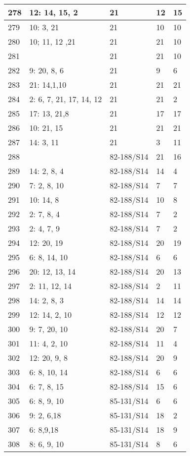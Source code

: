 \documentclass{article} %
\begin{document}
\begin{longtable}{| l | l | l | l | l |}
        278 & 12: 14, 15, 2 & 21 & 12 & 15 \\ \hline
        279 & 10: 3, 21 & 21 & 10 & 10 \\ \hline
        280 & 10; 11, 12 ,21 & 21 & 21 & 10 \\ \hline
        281 &  & 21 & 21 & 10 \\ \hline
        282 & 9: 20, 8, 6 & 21 & 9 & 6 \\ \hline
        283 & 21: 14,1,10 & 21 & 21 & 21 \\ \hline
        284 & 2: 6, 7, 21, 17, 14, 12 & 21 & 21 & 2 \\ \hline
        285 & 17: 13, 21,8 & 21 & 17 & 17 \\ \hline
        286 & 10: 21, 15 & 21 & 21 & 21 \\ \hline
        287 & 14: 3, 11 & 21 & 3 & 11 \\ \hline
        288 &  & 82-188/S14 & 21 & 16 \\ \hline
        289 & 14: 2, 8, 4 & 82-188/S14 & 14 & 4 \\ \hline
        290 & 7: 2, 8, 10 & 82-188/S14 & 7 & 7 \\ \hline
        291 & 10: 14, 8 & 82-188/S14 & 10 & 8 \\ \hline
        292 & 2: 7, 8, 4 & 82-188/S14 & 7 & 2 \\ \hline
        293 & 2: 4, 7, 9 & 82-188/S14 & 7 & 2 \\ \hline
        294 & 12: 20, 19 & 82-188/S14 & 20 & 19 \\ \hline
        295 & 6: 8, 14, 10 & 82-188/S14 & 6 & 6 \\ \hline
        296 & 20: 12, 13, 14 & 82-188/S14 & 20 & 13 \\ \hline
        297 & 2: 11, 12, 14 & 82-188/S14 & 2 & 11 \\ \hline
        298 & 14: 2, 8, 3 & 82-188/S14 & 14 & 14 \\ \hline
        299 & 12: 14, 2, 10 & 82-188/S14 & 12 & 12 \\ \hline
        300 & 9: 7, 20, 10 & 82-188/S14 & 20 & 7 \\ \hline
        301 & 11: 4, 2, 10 & 82-188/S14 & 11 & 4 \\ \hline
        302 & 12: 20, 9, 8 & 82-188/S14 & 20 & 9 \\ \hline
        303 & 6: 8, 10, 14 & 82-188/S14 & 6 & 6 \\ \hline
        304 & 6: 7, 8, 15 & 82-188/S14 & 15 & 6 \\ \hline
        305 & 6: 8, 9, 10 & 85-131/S14 & 6 & 6 \\ \hline
        306 & 9: 2, 6,18 & 85-131/S14 & 18 & 2 \\ \hline
        307 & 6: 8,9,18 & 85-131/S14 & 18 & 9 \\ \hline
        308 & 8: 6, 9, 10 & 85-131/S14 & 8 & 6 \\ \hline
\end{longtable}
\end{document}
